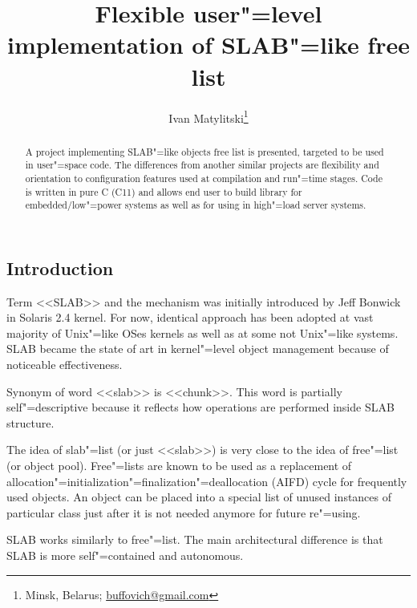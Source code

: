 \documentclass[10pt, a5paper]{article}
\begin{document}
\title{Flexible user"=level implementation of SLAB"=like free list}%

\author{Ivan Matylitski\footnote{Minsk, Belarus; \url{buffovich@gmail.com}}}
\maketitle

\begin{abstract}
A project implementing SLAB"=like objects free list is presented,   targeted to be used in user"=space code. The differences from another similar projects are flexibility and orientation to \linebreak configuration features used at compilation and run"=time stages. Code is written in pure C (C11) and allows end user to build library for embedded/low"=power systems as well as for using in high"=load server systems.
\end{abstract}

\subsection*{Introduction}

Term <<SLAB>> and the mechanism was initially introduced by Jeff Bonwick in Solaris 2.4 kernel. For now, identical approach has been adopted at vast majority of Unix"=like OSes kernels as well as at some not Unix"=like systems. SLAB became the state of art in kernel"=level object management because of noticeable effectiveness.

Synonym of word <<slab>> is <<chunk>>. This word is partially self"=descriptive because it reflects how operations are performed inside SLAB structure.

The idea of slab"=list (or just <<slab>>) is very close to the idea of free"=list (or object pool). Free"=lists are known to be used as a replacement of allocation"=initialization"=finalization"=deallocation (AIFD) cycle for \linebreak frequently used objects. An object can be placed into a special list of unused instances of particular class just after it is not needed anymore for future re"=using.

SLAB works similarly to free"=list. The main architectural difference is that SLAB is more self"=contained and autonomous.
\end{document}
